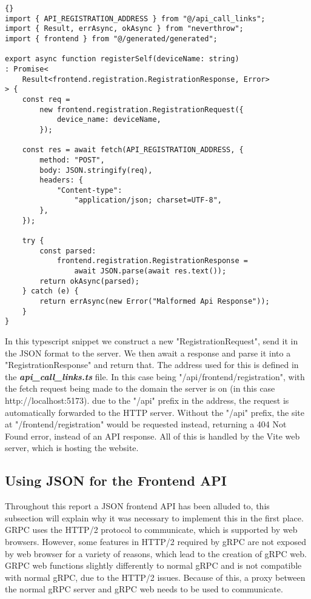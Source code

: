\begin{lstlisting}[language=ES6, style=boxed, showstringspaces=false]{}
import { API_REGISTRATION_ADDRESS } from "@/api_call_links";
import { Result, errAsync, okAsync } from "neverthrow";
import { frontend } from "@/generated/generated";

export async function registerSelf(deviceName: string)
: Promise<
    Result<frontend.registration.RegistrationResponse, Error>
> {
    const req = 
        new frontend.registration.RegistrationRequest({
            device_name: deviceName,
        });

    const res = await fetch(API_REGISTRATION_ADDRESS, {
        method: "POST",
        body: JSON.stringify(req),
        headers: {
            "Content-type": 
                "application/json; charset=UTF-8",
        },
    });

    try {
        const parsed: 
            frontend.registration.RegistrationResponse =
                await JSON.parse(await res.text());
        return okAsync(parsed);
    } catch (e) {
        return errAsync(new Error("Malformed Api Response"));
    }
}
\end{lstlisting}

In this typescript snippet we construct a new "RegistrationRequest", send it in the JSON format to the server. We then await a response and parse it into a "RegistrationResponse" and return that. The address used for this is defined in the \textit{\textbf{api\_call\_links.ts}} file. In this case being "/api/frontend/registration", with the fetch request being made to the domain the server is on (in this case http://localhost:5173). due to the "/api" prefix in the address, the request is automatically forwarded to the HTTP server. Without the "/api" prefix, the site at "/frontend/registration" would be requested instead, returning a 404 Not Found error, instead of an API response. All of this is handled by the Vite web server, which is hosting the website.

\subsection{Using JSON for the Frontend API} \label{sec:chapimpl:frontend:json}
Throughout this report a JSON frontend API has been alluded to, this subsection will explain why it was necessary to implement this in the first place. GRPC uses the HTTP/2 protocol to communicate, which is supported by web browsers. However, some features in HTTP/2 required by gRPC are not exposed by web browser \cite{grpcWeb} for a variety of reasons, which lead to the creation of gRPC web. GRPC web functions slightly differently to normal gRPC and is not compatible with normal gRPC, due to the HTTP/2 issues. Because of this, a proxy between the normal gRPC server and gRPC web needs to be used to communicate.

